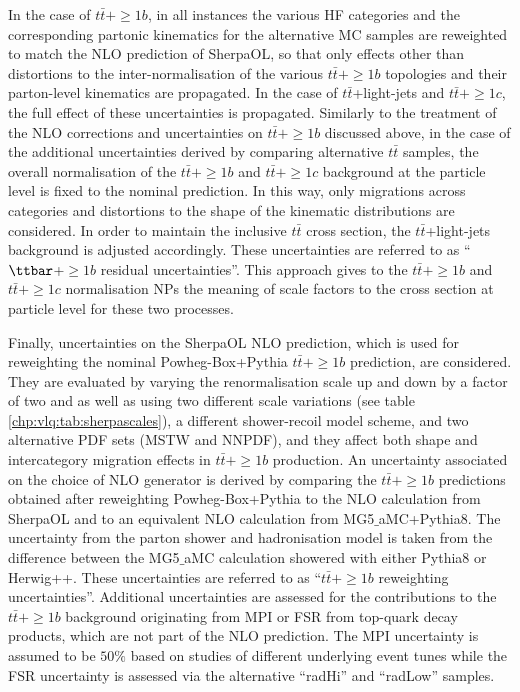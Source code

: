 In the case of $t\bar{t}+\ge1b$, in all instances the various HF categories and the corresponding partonic kinematics for the alternative MC samples are reweighted to match the NLO prediction of {\sc SherpaOL}, so that only effects other than distortions to the inter-normalisation of the various $t\bar{t}+\ge1b$ topologies and their parton-level kinematics are propagated.
In the case of $t\bar{t}$+light-jets and $t\bar{t}+\ge1c$, the full effect of these uncertainties is propagated. 
Similarly to the treatment of the NLO corrections and uncertainties on $t\bar{t}+\ge1b$  discussed above, in the case of the additional uncertainties derived by comparing alternative $t\bar{t}$ samples, the overall normalisation of the $t\bar{t}+\ge1b$  and $t\bar{t}+\ge1c$ background at the particle level is fixed to the nominal prediction. In this way, only migrations across categories and distortions to the shape of the kinematic distributions are considered. In order to maintain the inclusive $t\bar{t}$ cross section, the $t\bar{t}$+light-jets background is adjusted accordingly. These uncertainties  are referred to as ``$\ttbar$+$\ge1b$ residual uncertainties''.
This approach gives to the $t\bar{t}+\ge1b$  and $t\bar{t}+\ge1c$  normalisation NPs the meaning of scale factors to the cross section at particle level for these two processes. \par
Finally, uncertainties on the SherpaOL NLO prediction, which is used for reweighting the nominal {\sc Powheg-Box+Pythia}  $t\bar{t}+\ge1b$ prediction, are considered. They are evaluated by varying the renormalisation scale up and down by a factor of two and as well as using two different scale variations (see table \ref{chp:vlq:tab:sherpascales}), a different shower-recoil model scheme, and two alternative PDF sets (MSTW and NNPDF), and they affect both shape and intercategory migration effects in $t\bar{t}+\ge1b$ production.
An uncertainty associated on the choice of NLO generator is derived by comparing the $t\bar{t}+\ge1b$ predictions obtained after reweighting {\sc Powheg-Box+Pythia} to the NLO calculation from {\sc SherpaOL} and to an equivalent NLO calculation from {\sc MG5$\_$aMC+Pythia8}. The uncertainty from the parton shower and hadronisation model is taken from the difference between the {\sc MG5$\_$aMC} calculation showered with either {\sc Pythia8} or {\sc Herwig++}.
These uncertainties are referred to as ``$t\bar{t}+\ge1b$ reweighting uncertainties''.
Additional uncertainties are assessed for the contributions to the $t\bar{t}+\ge1b$  background originating from MPI or FSR from top-quark decay products, which are not part of the NLO prediction. The MPI uncertainty is assumed to be $50\%$ based on studies of different underlying event tunes while the FSR uncertainty is assessed via the alternative ``radHi'' and ``radLow'' samples.


